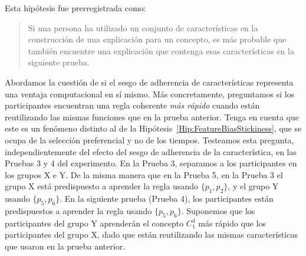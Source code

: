 \begin{hyp}
Esta hipótesis fue prerregistrada como:
\begin{quote}
Si una persona ha utilizado un conjunto de características en la construcción de una explicación para un concepto, es más probable que también encuentre una explicación que contenga esas características en la siguiente prueba.
\end{quote}
\end{hyp}


\begin{hyp}\label{Hip:FeatureBiasTimeAdvantage}
Abordamos la cuestión de si el sesgo de adherencia de características representa una ventaja computacional en sí mismo. Más concretamente, preguntamos si los participantes encuentran una regla coherente {\em más rápido} cuando están reutilizando las mismas funciones que en la prueba anterior. Tenga en cuenta que este es un fenómeno distinto al de la Hipótesis~\ref{Hip:FeatureBiasStickiness}, que se ocupa de la selección preferencial y no de los tiempos.
Testeamos esta pregunta, independientemente del efecto del sesgo de adherencia de la característica, en las Pruebas 3 y 4 del experimento. En la Prueba 3, separamos a los participantes en los grupos X e Y. De la misma manera que en la Prueba 5, en la Prueba 3 el grupo X está predispuesto a aprender la regla usando $\{p_1, p_2 \} $, y el grupo Y usando $\{p_5, p_6 \} $. En la siguiente prueba (Prueba 4), los participantes están predispuestos a aprender la regla usando $\{p_5, p_6 \} $. Suponemos que los participantes del grupo Y aprenderán el concepto $ C^4_1 $ más rápido que los participantes del grupo X, dado que están reutilizando las mismas características que usaron en la prueba anterior.


\end{hyp}

